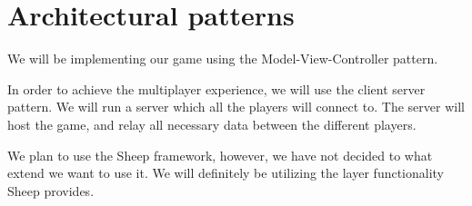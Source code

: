 \section{Architectural patterns} 
\label{architecturalpatterns}

We will be implementing our game using the Model-View-Controller pattern. 

In order to achieve the multiplayer experience, we will use the client server pattern. We will run a server which all the players will connect to. The server will host the game, and relay all necessary data between the different players. 

We plan to use the Sheep framework, however, we have not decided to what extend we want to use it. We will definitely be utilizing the layer functionality Sheep provides.